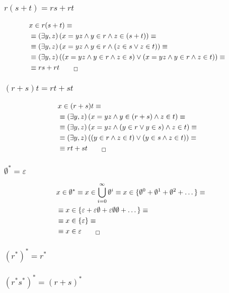 \documentclass{article}
\begin{document}
\subsubsection{$r(s+t)=rs+rt$}

\begin{align}
    &x\in r(s+t) \equiv&\\
    &\equiv \left(\exists y,z \right)\left(x=yz \land y\in r \land z\in (s+t)\right) \equiv\\
    &\equiv \left(\exists y,z \right)\left(x=yz \land y\in r \land \left(z\in s \lor z\in t\right)\right) \equiv\\
    &\equiv \left(\exists y,z \right)\left(\left(x=yz \land y\in r \land z\in s\right) \lor \left(x=yz \land y\in r \land z\in t\right)\right) \equiv\\
    &\equiv rs + rt_{\qed}
\end{align}

\subsubsection{$(r+s)t = rt + st$}

\begin{align}
    &x\in (r+s)t \equiv&\\
    &\equiv \left(\exists y,z \right)\left(x=yz \land y\in (r+s) \land z\in t\right) \equiv\\
    &\equiv \left(\exists y,z \right)\left(x=yz \land \left(y\in r \lor y\in s\right) \land z\in t\right) \equiv\\
    &\equiv \left(\exists y,z \right)\left(\left(y\in r \land z\in t\right) \lor \left(y\in s \land z\in t\right)\right) \equiv\\
    &\equiv rt + st_{\qed}
\end{align}

\subsubsection{$\emptyset^{*} = \varepsilon$}

\begin{align}
    &x\in \emptyset^{*} \equiv
    x\in \bigcup_{i=0}^{\infty} \emptyset^{i} \equiv
    x\in \{\emptyset^{0} + \emptyset^{1} + \emptyset^{2} + \dots\} \equiv\\
    &\equiv x \in \{\varepsilon + \varepsilon\emptyset + \varepsilon\emptyset\emptyset + \dots\} \equiv\\
    &\equiv x \in \{\varepsilon\} \equiv\\
    &\equiv x \in \varepsilon_{\qed}
\end{align}

\subsubsection{$(r^{*})^{*} = r^{*}$}

\subsubsection{$(r^{*}s^{*})^{*} = (r+s)^{*}$}
\end{document}
